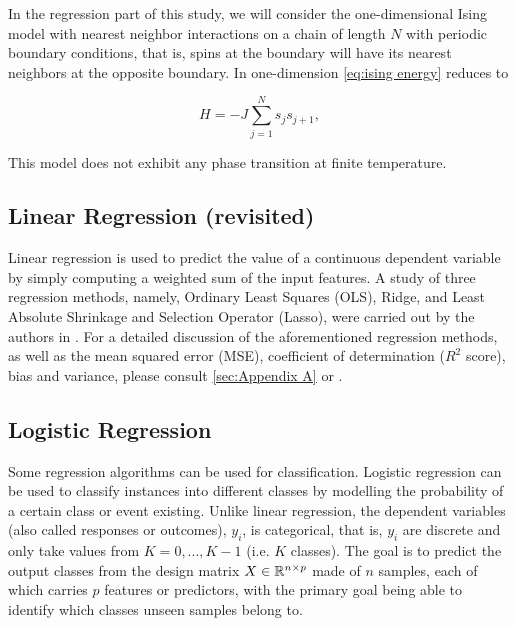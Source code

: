 In the regression part of this study, we will consider the one-dimensional Ising model with nearest neighbor interactions on a chain of length $N$ with periodic boundary conditions, that is, spins at the boundary will have its nearest neighbors at the opposite boundary. In one-dimension \autoref{eq:ising energy} reduces to 

\begin{equation}\label{eq:ising 1D energy}
    H  = - J \sum_{j=1}^N s_j s_{j+1},
\end{equation}

This model does not exhibit any phase transition at finite temperature.



\subsection{Linear Regression (revisited)}\label{sec:linreg theory}
Linear regression is used to predict the value of a continuous dependent variable by simply computing a weighted sum of the input features. A study of three regression methods, namely, Ordinary Least Squares (OLS), Ridge, and Least Absolute Shrinkage and Selection Operator (Lasso), were carried out by the authors in \cite{PROJone}. For a detailed discussion of the aforementioned regression methods, as well as the mean squared error (MSE), coefficient of determination ($R^2$ score), bias and variance, please consult \autoref{sec:Appendix A} or \cite{PROJone}.

\subsection{Logistic Regression}\label{sec:logreg theory}
Some regression algorithms can be used for classification. Logistic regression can be used to classify instances into different classes by modelling the probability of a certain class or event existing. Unlike linear regression, the dependent  variables (also called responses or outcomes), $y_i$, is categorical, that is, $y_i$ are discrete and only take values from $K=0, ..., K-1$ (i.e. $K$ classes). The goal is to predict the output classes from the design matrix $X \in \mathbb{R}^{n\times p}$ made of $n$ samples, each of which carries $p$ features or predictors, with the primary goal being able to identify which classes unseen samples belong to. \cite{logreglec} \cite{Hands-onML}

